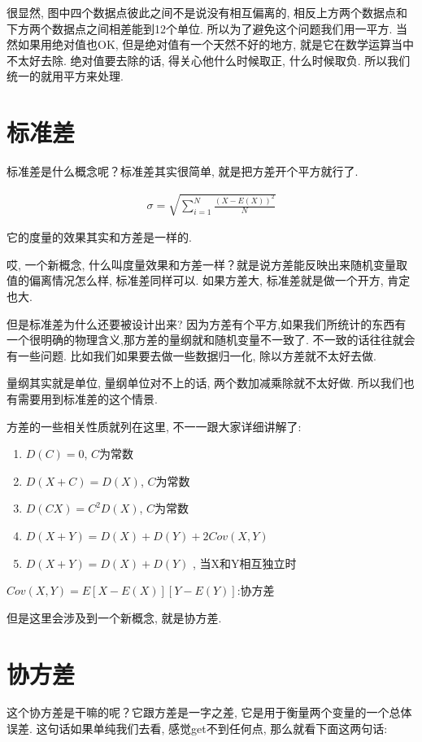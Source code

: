 很显然, 图中四个数据点彼此之间不是说没有相互偏离的, 相反上方两个数据点和下方两个数据点之间相差能到12个单位. 所以为了避免这个问题我们用一平方. 当然如果用绝对值也OK, 但是绝对值有一个天然不好的地方, 就是它在数学运算当中不太好去除. 绝对值要去除的话, 得关心他什么时候取正, 什么时候取负. 所以我们统一的就用平方来处理. 

\section{标准差}

标准差是什么概念呢？标准差其实很简单, 就是把方差开个平方就行了. 

\begin{align*}
  \sigma = \sqrt{\sum_{i=1}^N \frac{(X-E(X))^2}{N}}
\end{align*}

它的度量的效果其实和方差是一样的. 

哎, 一个新概念, 什么叫度量效果和方差一样？就是说方差能反映出来随机变量取值的偏离情况怎么样, 标准差同样可以. 如果方差大, 标准差就是做一个开方, 肯定也大. 

但是标准差为什么还要被设计出来? 因为方差有个平方,如果我们所统计的东西有一个很明确的物理含义,那方差的量纲就和随机变量不一致了. 不一致的话往往就会有一些问题. 比如我们如果要去做一些数据归一化, 除以方差就不太好去做. 

量纲其实就是单位, 量纲单位对不上的话, 两个数加减乘除就不太好做. 所以我们也有需要用到标准差的这个情景. 

方差的一些相关性质就列在这里, 不一一跟大家详细讲解了: 

\begin{enumerate}
  \item $D(C) = 0$, $C$为常数
  \item $D(X+C) = D(X)$, $C$为常数
  \item $D(CX) = C^2 D(X)$, $C$为常数
  \item $D(X+Y) = D(X) + D(Y) + 2Cov(X, Y)$
  \item $D(X+Y) = D(X) + D(Y)$ , 当X和Y相互独立时 
\end{enumerate}

$Cov(X,Y)=E{[X-E(X)][Y-E(Y)]}$:协方差

但是这里会涉及到一个新概念, 就是协方差. 

\section{协方差}

这个协方差是干嘛的呢？它跟方差是一字之差, 它是用于衡量两个变量的一个总体误差. 这句话如果单纯我们去看, 感觉get不到任何点, 那么就看下面这两句话: 

